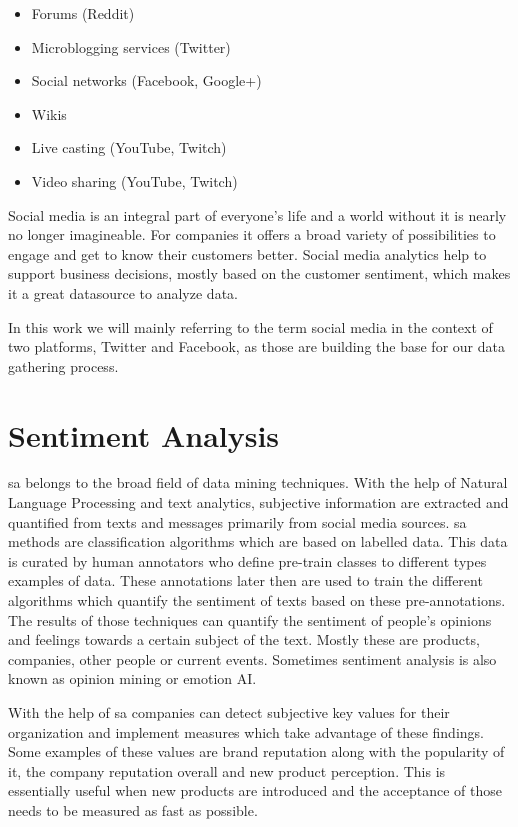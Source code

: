 \documentclass[11pt,titlepage,oneside,openany]{book}
\begin{document}
\begin{itemize}
	\item Forums (Reddit)
	\item Microblogging services (Twitter)
	\item Social networks (Facebook, Google+)
	\item Wikis
	\item Live casting (YouTube, Twitch)\\
	\item Video sharing (YouTube, Twitch)
\end{itemize}

Social media is an integral part of everyone’s life and a world without it is nearly no longer imagineable. For companies it offers a broad variety of possibilities to engage and get to know their customers better. Social media analytics help to support business decisions, mostly based on the customer sentiment, which makes it a great datasource to analyze data. \cite{Rouse2016-09-15}
\par
In this work we will mainly referring to the term social media in the context of two platforms, Twitter and Facebook, as those are building the base for our data gathering process. 


\section{Sentiment Analysis}
\label{sec:sentiment_analysis}

\acrfull{sa} belongs to the broad field of data mining techniques. With the help of Natural Language Processing and text analytics, subjective information are extracted and quantified from texts and messages primarily from social media sources. \acrshort{sa} methods are classification algorithms which are based on labelled data. This data is curated by human annotators who define pre-train classes to different types examples of data. These annotations later then are used to train the different algorithms which quantify the sentiment of texts based on these pre-annotations. The results of those techniques can quantify the sentiment of people's opinions and feelings towards a certain subject of the text. Mostly these are products, companies, other people or current events. Sometimes sentiment analysis is also known as opinion mining or emotion AI.

With the help of \acrlong{sa} companies can detect subjective key values for their organization and implement measures which take advantage of these findings. Some examples of these values are brand reputation along with the popularity of it, the company reputation overall and new product perception. This is essentially useful when new products are introduced and the acceptance of those needs to be measured as fast as possible. \cite{Techopedia2014-01-21}
\end{document}
